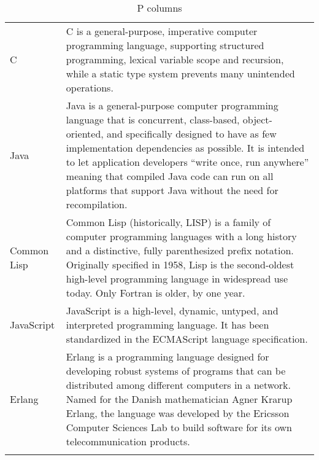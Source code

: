         \begin{table}[!ht]
            \label{P columns}
        \begin{tabular}{ p{1in} p{4in}}
            \hline{}
            C & C is a general-purpose, imperative computer programming language, supporting structured programming, lexical variable scope and recursion, while a static type system prevents many unintended operations. \\
            Java & Java is a general-purpose computer programming language that is concurrent, class-based, object-oriented, and specifically designed to have as few implementation dependencies as possible. It is intended to let application developers ``write once, run anywhere'' meaning that compiled Java code can run on all platforms that support Java without the need for recompilation. \\
            Common Lisp & Common Lisp (historically, LISP) is a family of computer programming languages with a long history and a distinctive, fully parenthesized prefix notation. Originally specified in 1958, Lisp is the second-oldest high-level programming language in widespread use today. Only Fortran is older, by one year. \\
            JavaScript & JavaScript is a high-level, dynamic, untyped, and interpreted programming language. It has been standardized in the ECMAScript language specification. \\
            Erlang & Erlang is a programming language designed for developing robust systems of programs that can be distributed among different computers in a network. Named for the Danish mathematician Agner Krarup Erlang, the language was developed by the Ericsson Computer Sciences Lab to build software for its own telecommunication products.  \\
            \hline{}
        \end{tabular}
            \caption{P columns}
        \end{table}


